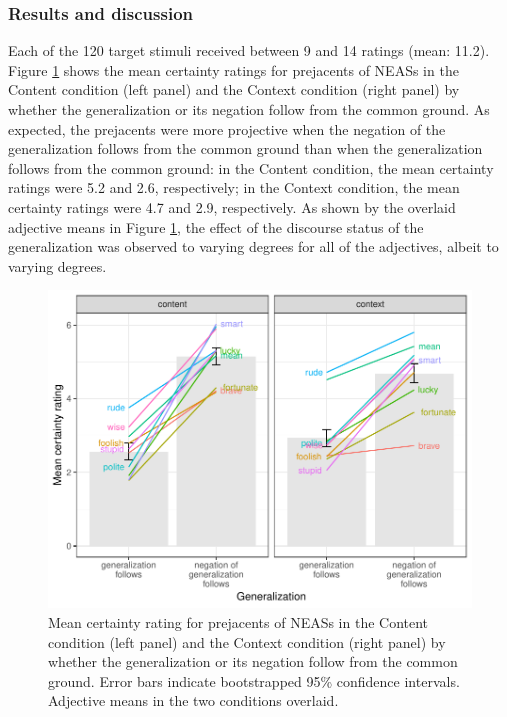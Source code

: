 \documentclass[11pt,fleqn]{article}
\newcommand{\6}{\mbox{$[\hspace*{-.6mm}[$}}
\newcommand{\9}{\mbox{$]\hspace*{-.6mm}]$}}
\begin{document}
\subsubsection{Results and discussion}

Each of the 120 target stimuli received between 9 and 14 ratings (mean: 11.2). Figure \ref{f-condis} shows the mean certainty ratings for prejacents of NEASs in the Content condition (left panel) and the Context condition (right panel) by whether the generalization or its negation follow from the common ground. As expected, the prejacents were more projective when the negation of the generalization follows from the common ground than when the generalization follows from the common ground: in the Content condition, the mean certainty ratings were 5.2 and 2.6, respectively; in the Context condition, the mean certainty ratings were 4.7 and 2.9, respectively. As shown by the overlaid adjective means in Figure \ref{f-condis}, the effect of the discourse status of the generalization was observed to varying degrees for all of the adjectives, albeit to varying degrees.

\begin{figure}[H]
\begin{center}
\includegraphics[scale=.75]{../exp2-projection/graphs/mean-certainty-ratings}

\caption{Mean certainty rating for prejacents of NEASs in the Content condition (left panel) and the Context condition (right panel) by whether the generalization or its negation follow from the common ground. Error bars indicate bootstrapped 95\% confidence intervals. Adjective means in the two conditions overlaid.}\label{f-condis}
\end{center}
\end{figure}
\end{document}
